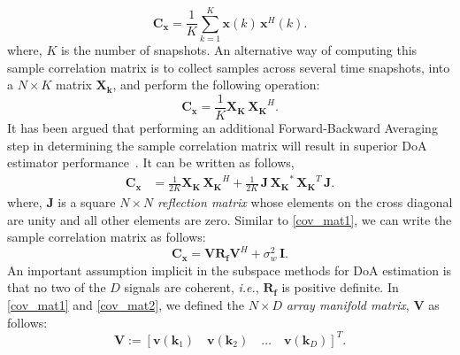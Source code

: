 \documentclass[a4paper, 11pt]{article}
\begin{document}
\begin{equation}
\mathbf{C_x} = \frac{1}{K}\sum_{k=1}^{K}\mathbf{x}(k)\,\mathbf{x}^H(k).
\end{equation}
where, $K$ is the number of snapshots. An alternative way of computing this sample correlation matrix is to collect samples across several time snapshots, into a $N\times K$ matrix $\mathbf{X_k}$, and perform the following operation:
\begin{equation}
\mathbf{C_x} = \frac{1}{K}\mathbf{X_K}\,\mathbf{X_K}^H.
\end{equation}
It has been argued that performing an additional Forward-Backward Averaging step in determining the sample correlation matrix will result in superior DoA estimator performance~\cite{trees}. It can be written as follows, 
\begin{align}
\mathbf{C_x} &= \frac{1}{2K}\mathbf{X_K}\,\mathbf{X_K}^H+\frac{1}{2K}\,\mathbf{J}\,\mathbf{X_K}^*\,\mathbf{X_K}^T\,\mathbf{J}.
\end{align}
where, $\mathbf{J}$ is a square $N\times N$ \textit{reflection matrix} whose elements on the cross diagonal are unity and all other elements are zero. Similar to \eqref{cov_mat1}, we can write the sample correlation matrix as follows: 
\begin{equation}
\mathbf{C_x} = \mathbf{V}\mathbf{R_f}\mathbf{V}^H+\sigma_w^2\,\mathbf{I}. 
\label{cov_mat2}
\end{equation}
An important assumption implicit in the subspace methods for DoA estimation is that no two of the $D$ signals are coherent, \textit{i.e.}, $\mathbf{R_f}$ is positive definite. In \eqref{cov_mat1} and \eqref{cov_mat2}, we defined the $N\times D$ \textit{array manifold matrix}, $\mathbf{V}$\footnotemark{} as follows:
\begin{equation}
\mathbf{V}:=\left[\mathbf{v}(\mathbf{k}_1)\quad \mathbf{v}(\mathbf{k}_2)\quad\hdots\quad \mathbf{v}(\mathbf{k}_D)\right]^T.
\label{amm}
\end{equation}
\end{document}
